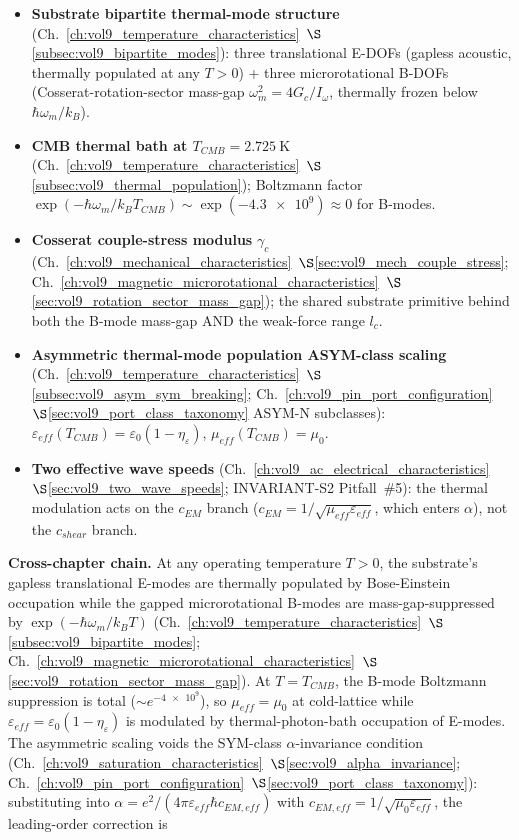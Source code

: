 \begin{itemize}
    \item \textbf{Substrate bipartite thermal-mode structure} (Ch.~\ref{ch:vol9_temperature_characteristics}~$\S$\ref{subsec:vol9_bipartite_modes}): three translational E-DOFs (gapless acoustic, thermally populated at any $T > 0$) + three microrotational B-DOFs (Cosserat-rotation-sector mass-gap $\omega_m^2 = 4G_c/I_\omega$, thermally frozen below $\hbar\omega_m/k_B$).
    \item \textbf{CMB thermal bath at $T_{CMB} = \qty{2.725}{\kelvin}$} (Ch.~\ref{ch:vol9_temperature_characteristics}~$\S$\ref{subsec:vol9_thermal_population}); Boltzmann factor $\exp(-\hbar\omega_m/k_BT_{CMB}) \sim \exp(-\num{4.3e9}) \approx 0$ for B-modes.
    \item \textbf{Cosserat couple-stress modulus} $\gamma_c$ (Ch.~\ref{ch:vol9_mechanical_characteristics}~$\S$\ref{sec:vol9_mech_couple_stress}; Ch.~\ref{ch:vol9_magnetic_microrotational_characteristics}~$\S$\ref{sec:vol9_rotation_sector_mass_gap}); the shared substrate primitive behind both the B-mode mass-gap AND the weak-force range $l_c$.
    \item \textbf{Asymmetric thermal-mode population ASYM-class scaling} (Ch.~\ref{ch:vol9_temperature_characteristics}~$\S$\ref{subsec:vol9_asym_sym_breaking}; Ch.~\ref{ch:vol9_pin_port_configuration}~$\S$\ref{sec:vol9_port_class_taxonomy} ASYM-N subclasses): $\varepsilon_{eff}(T_{CMB}) = \varepsilon_0(1 - \eta_\varepsilon)$, $\mu_{eff}(T_{CMB}) = \mu_0$.
    \item \textbf{Two effective wave speeds} (Ch.~\ref{ch:vol9_ac_electrical_characteristics}~$\S$\ref{sec:vol9_two_wave_speeds}; INVARIANT-S2 Pitfall~\#5): the thermal modulation acts on the $c_{EM}$ branch ($c_{EM} = 1/\sqrt{\mu_{eff}\varepsilon_{eff}}$, which enters $\alpha$), not the $c_{shear}$ branch.
\end{itemize}

\textbf{Cross-chapter chain.} At any operating temperature $T > 0$, the substrate's gapless translational E-modes are thermally populated by Bose-Einstein occupation while the gapped microrotational B-modes are mass-gap-suppressed by $\exp(-\hbar\omega_m/k_BT)$ (Ch.~\ref{ch:vol9_temperature_characteristics}~$\S$\ref{subsec:vol9_bipartite_modes}; Ch.~\ref{ch:vol9_magnetic_microrotational_characteristics}~$\S$\ref{sec:vol9_rotation_sector_mass_gap}). At $T = T_{CMB}$, the B-mode Boltzmann suppression is total ($\sim e^{-\num{4e9}}$), so $\mu_{eff} = \mu_0$ at cold-lattice while $\varepsilon_{eff} = \varepsilon_0(1 - \eta_\varepsilon)$ is modulated by thermal-photon-bath occupation of E-modes. The asymmetric scaling voids the SYM-class $\alpha$-invariance condition (Ch.~\ref{ch:vol9_saturation_characteristics}~$\S$\ref{sec:vol9_alpha_invariance}; Ch.~\ref{ch:vol9_pin_port_configuration}~$\S$\ref{sec:vol9_port_class_taxonomy}): substituting into $\alpha = e^2/(4\pi\varepsilon_{eff}\hbar c_{EM,eff})$ with $c_{EM,eff} = 1/\sqrt{\mu_0\varepsilon_{eff}}$, the leading-order correction is

